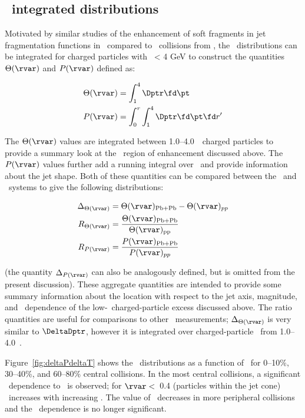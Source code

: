 \subsection{\pt\ integrated distributions}
\label{sec:discussion_int}
Motivated by similar studies of the enhancement of soft fragments in 
jet fragmentation functions in \pbpb\ compared to \pp\ collisions from \cite{PhysRevC.98.024908}, the \Dptr\ distributions can be integrated for charged particles with \pt\ < 4 GeV to construct the quantities $\Theta(\rvar)$ and $P(\rvar)$ defined as:

\begin{align}
   \Theta(\rvar) &= \int_1^{4} \Dptr  \fd \pt \\
   P(\rvar) &= \int_0^r \int_1^{4} \Dptr \fd \pt \fd r'
\end{align}

The $\Theta(\rvar)$ values are integrated between 1.0--4.0~\GeV\ charged particles to provide a summary look at
the \pt\ region of enhancement discussed above.  The $P(\rvar)$ values further add a running integral over \rvar\
and provide information about the jet shape.
Both of these quantities can be compared between the \pp\ and \pbpb\ systems to give the following distributions:

\begin{align}
   \Delta_{\Theta(\rvar)} &= \Theta(\rvar)_{\mathrm{Pb+Pb}} - \Theta(\rvar)_{pp} \\
   R_{\Theta(\rvar)} &= \frac{\Theta(\rvar)_{\mathrm{Pb+Pb}}}{\Theta(\rvar)_{\mathrm{pp}}} \\
   R_{P(\rvar)} &= \frac{P(\rvar)_{\mathrm{Pb+Pb}}}{P(\rvar)_{pp}}
\end{align}

(the quantity $\Delta_{P(\rvar)}$ can also be analogously defined, but is omitted from the present discussion).
These aggregate quantities are intended to provide some summary information about the location with respect to the 
jet axis, magnitude, and \ptjet\ dependence of the low-\pt\ charged-particle excess discussed above.
The ratio quantities are useful for comparisons to other \pbpb\ measurements; $\Delta_{\Theta(\rvar)}$ is very similar 
to $\DeltaDptr$, however it is integrated over charged-particle \pt\ from 1.0--4.0~\GeV.

Figure~\ref{fig:deltaPdeltaT} shows the \DeltaTheta\ distributions as a function of \rvar\ for 0--10\%, 30--40\%,
and 60--80\% central collisions. 
In the most central collisions, a significant \ptjet\ dependence to \DeltaTheta\ is observed; for $\rvar <$~0.4 (particles
within the jet cone) \DeltaTheta\ increases with increasing \ptjet.
The value of \DeltaTheta\ decreases in more peripheral collisions and the \ptjet\ dependence is no longer significant.


